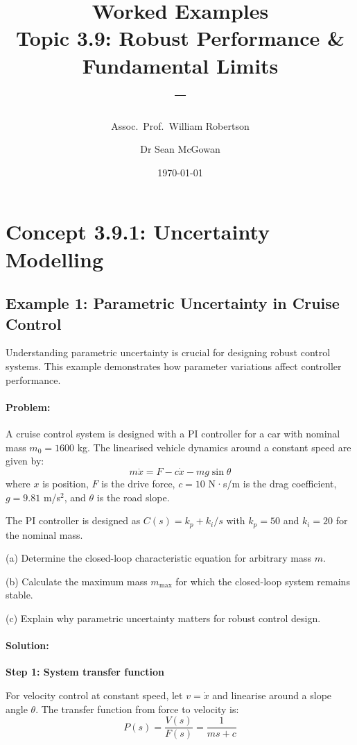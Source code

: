 \documentclass[11pt,a4paper]{article}
\title{\textbf{Worked Examples}\\[0.5em]
\large Topic 3.9: Robust Performance \& Fundamental Limits\\[0.3em]
\normalsize \coursesubtitle{} -- \coursetitle}
\author{Assoc.\ Prof.\ William Robertson \and Dr Sean McGowan}
\date{\today}
\begin{document}
\maketitle
\tableofcontents
\newpage

\section{Concept 3.9.1: Uncertainty Modelling}

\subsection{Example 1: Parametric Uncertainty in Cruise Control}

Understanding parametric uncertainty is crucial for designing robust control systems. This example demonstrates how parameter variations affect controller performance.

\paragraph{Problem:} 
A cruise control system is designed with a PI controller for a car with nominal mass $m_0 = 1600$ kg. The linearised vehicle dynamics around a constant speed are given by:
\[
m\ddot{x} = F - c\dot{x} - mg\sin\theta
\]
where $x$ is position, $F$ is the drive force, $c = 10$ N·s/m is the drag coefficient, $g = 9.81$ m/s$^2$, and $\theta$ is the road slope.

The PI controller is designed as $C(s) = k_p + k_i/s$ with $k_p = 50$ and $k_i = 20$ for the nominal mass. 

(a) Determine the closed-loop characteristic equation for arbitrary mass $m$.

(b) Calculate the maximum mass $m_{\max}$ for which the closed-loop system remains stable.

(c) Explain why parametric uncertainty matters for robust control design.

\paragraph{Solution:}

\textbf{Step 1: System transfer function}

For velocity control at constant speed, let $v = \dot{x}$ and linearise around a slope angle $\theta$. The transfer function from force to velocity is:
\[
P(s) = \frac{V(s)}{F(s)} = \frac{1}{ms + c}
\]
\end{document}
